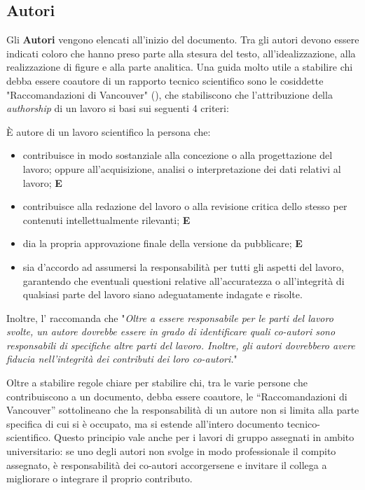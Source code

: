 \documentclass[9pt,a4paper,twoside]{rho-class/rho}
\begin{document}
\subsection{Autori}
Gli \textbf{Autori} vengono elencati all'inizio del documento. Tra gli autori devono essere indicati coloro che hanno preso parte alla stesura del testo, all'idealizzazione, alla realizzazione di figure e alla parte analitica. Una guida molto utile a stabilire chi debba essere coautore di un rapporto tecnico scientifico sono le cosiddette "Raccomandazioni di Vancouver" (\cite{Vancouver}), che stabiliscono che l’attribuzione della \textit{authorship} di un lavoro si basi sui seguenti 4 criteri:

È autore di un lavoro scientifico la persona che:
\begin{itemize}
    \item contribuisce in modo sostanziale alla concezione o alla progettazione del lavoro; oppure all’acquisizione, analisi o interpretazione dei dati relativi al lavoro; 
    \textbf{E}
    \item contribuisce alla redazione del lavoro o alla revisione critica dello stesso per contenuti intellettualmente rilevanti; 
    \textbf{E}
    \item dia la propria approvazione finale della versione da pubblicare; 
    \textbf{E}
    \item sia d'accordo ad assumersi la responsabilità per tutti gli aspetti del lavoro, garantendo che eventuali questioni relative all’accuratezza o all’integrità di qualsiasi parte del lavoro siano adeguatamente indagate e risolte.
\end{itemize}

Inoltre, l'\cite{Vancouver} raccomanda che "\textit{Oltre a essere responsabile per le parti del lavoro svolte, un autore dovrebbe essere in grado di identificare quali co-autori sono responsabili di specifiche altre parti del lavoro. Inoltre, gli autori dovrebbero avere fiducia nell’integrità dei contributi dei loro co-autori.}"

Oltre a stabilire regole chiare per stabilire chi, tra le varie persone che contribuiscono a un documento, debba essere coautore, le “Raccomandazioni di Vancouver” sottolineano che la responsabilità di un autore non si limita alla parte specifica di cui si è occupato, ma si estende all'intero documento tecnico-scientifico. Questo principio vale anche per i lavori di gruppo assegnati in ambito universitario: se uno degli autori non svolge in modo professionale il compito assegnato, è responsabilità dei co-autori accorgersene e invitare il collega a migliorare o integrare il proprio contributo.
\end{document}
